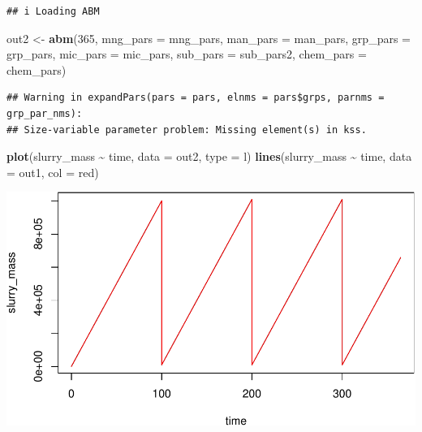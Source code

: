\documentclass[
]{article}
\newenvironment{Shaded}{\begin{snugshade}}{\end{snugshade}}
\newcommand{\AttributeTok}[1]{\textcolor[rgb]{0.13,0.29,0.53}{#1}}
\newcommand{\DecValTok}[1]{\textcolor[rgb]{0.00,0.00,0.81}{#1}}
\newcommand{\FunctionTok}[1]{\textcolor[rgb]{0.13,0.29,0.53}{\textbf{#1}}}
\newcommand{\NormalTok}[1]{#1}
\newcommand{\OtherTok}[1]{\textcolor[rgb]{0.56,0.35,0.01}{#1}}
\newcommand{\SpecialCharTok}[1]{\textcolor[rgb]{0.81,0.36,0.00}{\textbf{#1}}}
\newcommand{\StringTok}[1]{\textcolor[rgb]{0.31,0.60,0.02}{#1}}
\begin{document}
\begin{verbatim}
## i Loading ABM
\end{verbatim}

\begin{Shaded}
\begin{Highlighting}[]
\NormalTok{out2 }\OtherTok{\textless{}{-}} \FunctionTok{abm}\NormalTok{(}\DecValTok{365}\NormalTok{,}
            \AttributeTok{mng\_pars =}\NormalTok{ mng\_pars,}
            \AttributeTok{man\_pars =}\NormalTok{ man\_pars,}
            \AttributeTok{grp\_pars =}\NormalTok{ grp\_pars,}
            \AttributeTok{mic\_pars =}\NormalTok{ mic\_pars,}
            \AttributeTok{sub\_pars =}\NormalTok{ sub\_pars2,}
            \AttributeTok{chem\_pars =}\NormalTok{ chem\_pars)}
\end{Highlighting}
\end{Shaded}

\begin{verbatim}
## Warning in expandPars(pars = pars, elnms = pars$grps, parnms = grp_par_nms):
## Size-variable parameter problem: Missing element(s) in kss.
\end{verbatim}

\begin{Shaded}
\begin{Highlighting}[]
\FunctionTok{plot}\NormalTok{(slurry\_mass }\SpecialCharTok{\textasciitilde{}}\NormalTok{ time, }\AttributeTok{data =}\NormalTok{ out2, }\AttributeTok{type =} \StringTok{\textquotesingle{}l\textquotesingle{}}\NormalTok{)}
\FunctionTok{lines}\NormalTok{(slurry\_mass }\SpecialCharTok{\textasciitilde{}}\NormalTok{ time, }\AttributeTok{data =}\NormalTok{ out1, }\AttributeTok{col =} \StringTok{\textquotesingle{}red\textquotesingle{}}\NormalTok{)}
\end{Highlighting}
\end{Shaded}

\includegraphics{simple_demo_files/figure-latex/unnamed-chunk-13-1.pdf}
\end{document}
